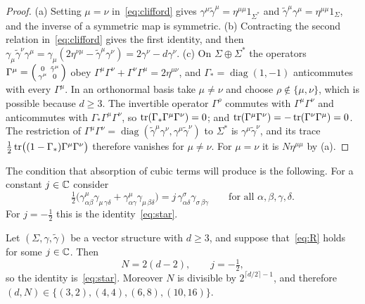 \begin{proof}
(a) Setting $\mu=\nu$ in~\eqref{eq:clifford} gives $\gamma^\mu\tilde\gamma^\mu=\eta^{\mu\mu}1_{\Sigma^*}$ and $\tilde\gamma^\mu\gamma^\mu=\eta^{\mu\mu}1_\Sigma$, and the inverse of a symmetric map is symmetric. (b) Contracting the second relation in~\eqref{eq:clifford} gives the first identity, and then $\gamma_\mu\tilde\gamma^\nu\gamma^\mu=\gamma_\mu(2\eta^{\nu\mu}-\tilde\gamma^\mu\gamma^\nu)=2\gamma^\nu-d\gamma^\nu$. (c) On $\Sigma\oplus\Sigma^*$ the operators $\Gamma^\mu=\begin{psmallmatrix}0&\tilde\gamma^\mu\\ \gamma^\mu&0\end{psmallmatrix}$ obey $\Gamma^\mu\Gamma^\nu+\Gamma^\nu\Gamma^\mu=2\eta^{\mu\nu}$, and $\Gamma_*=\operatorname{diag}(1,-1)$ anticommutes with every $\Gamma^\mu$. In an orthonormal basis take $\mu\ne\nu$ and choose $\rho\notin\{\mu,\nu\}$, which is possible because $d\ge3$. The invertible operator $\Gamma^\rho$ commutes with $\Gamma^\mu\Gamma^\nu$ and anticommutes with $\Gamma_*\Gamma^\mu\Gamma^\nu$, so $\operatorname{tr}(\Gamma_*\Gamma^\mu\Gamma^\nu)=0$; and $\operatorname{tr}(\Gamma^\mu\Gamma^\nu)=-\operatorname{tr}(\Gamma^\nu\Gamma^\mu)=0$. The restriction of $\Gamma^\mu\Gamma^\nu=\operatorname{diag}(\tilde\gamma^\mu\gamma^\nu,\gamma^\mu\tilde\gamma^\nu)$ to $\Sigma^*$ is $\gamma^\mu\tilde\gamma^\nu$, and its trace $\frac12\operatorname{tr}\bigl((1-\Gamma_*)\Gamma^\mu\Gamma^\nu\bigr)$ therefore vanishes for $\mu\ne\nu$. For $\mu=\nu$ it is $N\eta^{\mu\mu}$ by (a).
\end{proof}

The condition that absorption of cubic terms will produce is the following. For a constant $j\in\mathbb{C}$ consider
\begin{equation}
\label{eq:R}
\tfrac12\bigl(\gamma^\mu_{\alpha\beta}\gamma_{\mu\,\gamma\delta}+\gamma^\mu_{\alpha\gamma}\gamma_{\mu\,\beta\delta}\bigr)=j\,\gamma^\sigma_{\alpha\delta}\gamma_{\sigma\,\beta\gamma}\qquad\text{for all }\alpha,\beta,\gamma,\delta.
\end{equation}
For $j=-\frac12$ this is the identity~\eqref{eq:star}.

\begin{theorem}
\label{thm:vector}
Let $(\Sigma,\gamma,\tilde\gamma)$ be a vector structure with $d\ge3$, and suppose that~\eqref{eq:R} holds for some $j\in\mathbb{C}$. Then
\begin{equation}
\label{eq:N}
N=2(d-2),\qquad j=-\tfrac12,
\end{equation}
so the identity is~\eqref{eq:star}. Moreover $N$ is divisible by $2^{\lceil d/2\rceil-1}$, and therefore $(d,N)\in\{(3,2),(4,4),(6,8),(10,16)\}$.
\end{theorem}

